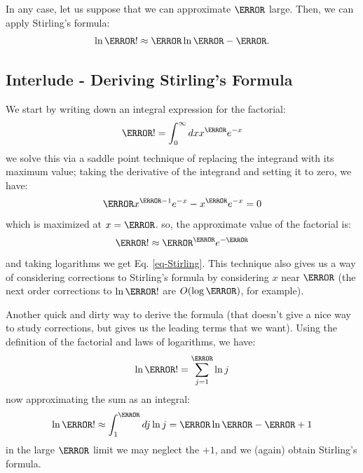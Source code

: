 In any case, let us suppose that we can approximate $\N$ large. Then, we can apply Stirling's formula:
\begin{equation}\label{eq-Stirling}
    \ln \N! \approx \N\ln \N - \N.
\end{equation}

\subsection{Interlude - Deriving Stirling's Formula}
We start by writing down an integral expression for the factorial:
\begin{equation}
    \N! = \int_0^\infty dx x^\N e^{-x}
\end{equation}
we solve this via a saddle point technique of replacing the integrand with its maximum value; taking the derivative of the integrand and setting it to zero, we have:
\begin{equation}
    \N x^{\N-1}e^{-x} - x^\N e^{-x} = 0
\end{equation}
which is maximized at $x = \N$. so, the approximate value of the factorial is:
\begin{equation}
    \N! \approx \N^\N e^{-\N}
\end{equation}
and taking logarithms we get Eq. \eqref{eq-Stirling}. This technique also gives us a way of considering corrections to Stirling's formula by considering $x$ near $\N$ (the next order corrections to $\ln \N!$ are $O(\log \N)$, for example).

Another quick and dirty way to derive the formula (that doesn't give a nice way to study corrections, but gives us the leading terms that we want). Using the definition of the factorial and laws of logarithms, we have:
\begin{equation}
    \ln \N! = \sum_{j=1}^\N \ln j
\end{equation}
now approximating the sum as an integral:
\begin{equation}
    \ln\N! \approx \int_1^\N dj \ln j = \N\ln\N - \N + 1
\end{equation}
in the large $\N$ limit we may neglect the $+1$, and we (again) obtain Stirling's formula.

